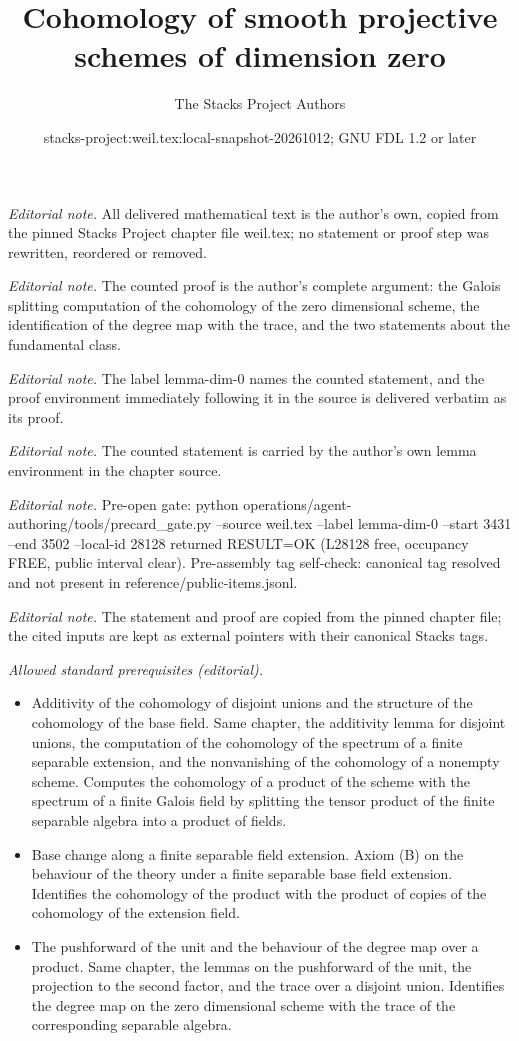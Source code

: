 \documentclass[10pt,a4paper]{amsart}
\title{Cohomology of smooth projective schemes of dimension zero}
\author{The Stacks Project Authors}
\date{stacks-project:weil.tex:local-snapshot-20261012; GNU FDL 1.2 or later}
\theoremstyle{plain}
\theoremstyle{definition}
\theoremstyle{remark}
\numberwithin{equation}{subsection}
\begin{document}
\maketitle
\noindent\textit{Editorial note.} All delivered mathematical text is the author's own, copied from the pinned Stacks Project chapter file weil.tex; no statement or proof step was rewritten, reordered or removed.\par\medskip
\noindent\textit{Editorial note.} The counted proof is the author's complete argument: the Galois splitting computation of the cohomology of the zero dimensional scheme, the identification of the degree map with the trace, and the two statements about the fundamental class.\par\medskip
\noindent\textit{Editorial note.} The label lemma-dim-0 names the counted statement, and the proof environment immediately following it in the source is delivered verbatim as its proof.\par\medskip
\noindent\textit{Editorial note.} The counted statement is carried by the author's own lemma environment in the chapter source.\par\medskip
\noindent\textit{Editorial note.} Pre-open gate: python operations/agent-authoring/tools/precard\_gate.py --source weil.tex --label lemma-dim-0 --start 3431 --end 3502 --local-id 28128 returned RESULT=OK (L28128 free, occupancy FREE, public interval clear). Pre-assembly tag self-check: canonical tag resolved and not present in reference/public-items.jsonl.\par\medskip
\noindent\textit{Editorial note.} The statement and proof are copied from the pinned chapter file; the cited inputs are kept as external pointers with their canonical Stacks tags.\par\medskip
\noindent\textit{Allowed standard prerequisites (editorial).}\begin{itemize}
\item Additivity of the cohomology of disjoint unions and the structure of the cohomology of the base field. Same chapter, the additivity lemma for disjoint unions, the computation of the cohomology of the spectrum of a finite separable extension, and the nonvanishing of the cohomology of a nonempty scheme. Computes the cohomology of a product of the scheme with the spectrum of a finite Galois field by splitting the tensor product of the finite separable algebra into a product of fields.
\item Base change along a finite separable field extension. Axiom (B) on the behaviour of the theory under a finite separable base field extension. Identifies the cohomology of the product with the product of copies of the cohomology of the extension field.
\item The pushforward of the unit and the behaviour of the degree map over a product. Same chapter, the lemmas on the pushforward of the unit, the projection to the second factor, and the trace over a disjoint union. Identifies the degree map on the zero dimensional scheme with the trace of the corresponding separable algebra.
\end{itemize}\medskip
\end{document}
